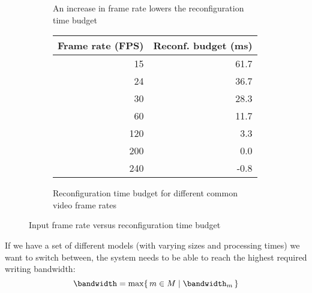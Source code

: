 \begin{figure}[htbp]
    \centering
    \begin{subfigure}[b]{0.48\textwidth}
        \begin{adjustbox}{width=\linewidth}
        
        \end{adjustbox}
        \caption{An increase in frame rate lowers the reconfiguration time budget}
        \label{fig:frame_rate_versus_time_budget}
    \end{subfigure}
    \hfill
    \begin{subfigure}[b]{0.48\textwidth}
        \begin{tabular}{@{}rr@{}}
        \toprule
        Frame rate (FPS) & Reconf. budget (ms) \\ \midrule
        15               & 61.7                \\
        24               & 36.7                \\
        30               & 28.3                \\
        60               & 11.7                \\
        120              & 3.3                 \\
        200              & 0.0                 \\
        240              & -0.8                \\ \bottomrule
        \end{tabular}
        \caption{Reconfiguration time budget for different common video frame rates}
        \label{tab:common_fps}
    \end{subfigure}
    \caption[]{Input frame rate versus reconfiguration time budget}
\end{figure}

If we have a set of different models (with varying sizes and processing times) we want to switch between, the system needs to be able to reach the highest required writing bandwidth:
\begin{equation}
    \bandwidth = \max\{\,m \in M \mid \bandwidth_m \,\} 
\end{equation}
